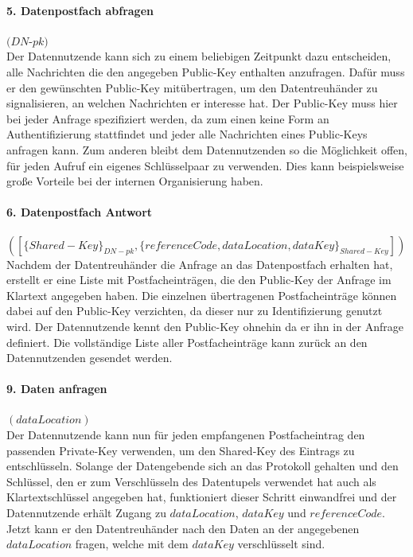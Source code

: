 \documentclass[
	fontsize=12pt,
	headings=small,
	parskip=half,           %
	bibliography=totoc,
	numbers=noenddot,       %
	open=any,               %
]{scrreprt}
\begin{document}
\paragraph{5. Datenpostfach abfragen} $(DN$-$pk)$\\
Der Datennutzende kann sich zu einem beliebigen Zeitpunkt dazu entscheiden, alle Nachrichten die den angegeben Public-Key enthalten anzufragen. Dafür muss er den gewünschten Public-Key mitübertragen, um den Datentreuhänder zu signalisieren, an welchen Nachrichten er interesse hat. Der Public-Key muss hier bei jeder Anfrage spezifiziert werden, da zum einen keine Form an Authentifizierung stattfindet und jeder alle Nachrichten eines Public-Keys anfragen kann. Zum anderen bleibt dem Datennutzenden so die Möglichkeit offen, für jeden Aufruf ein eigenes Schlüsselpaar zu verwenden. Dies kann beispielsweise große Vorteile bei der internen Organisierung haben.

\paragraph{6. Datenpostfach Antwort} $([\{Shared-Key\}_{DN-pk}, \{referenceCode, dataLocation, dataKey\}_{Shared-Key}])$\\
Nachdem der Datentreuhänder die Anfrage an das Datenpostfach erhalten hat, erstellt er eine Liste mit Postfacheinträgen, die den Public-Key der Anfrage im Klartext angegeben haben. Die einzelnen übertragenen Postfacheinträge können dabei auf den Public-Key verzichten, da dieser nur zu Identifizierung genutzt wird. Der Datennutzende kennt den Public-Key ohnehin da er ihn in der Anfrage definiert. Die vollständige Liste aller Postfacheinträge kann zurück an den Datennutzenden gesendet werden.

\paragraph{9. Daten anfragen} $(dataLocation)$\\
Der Datennutzende kann nun für jeden empfangenen Postfacheintrag den passenden Private-Key verwenden, um den Shared-Key des Eintrags zu entschlüsseln. Solange der Datengebende sich an das Protokoll gehalten und den Schlüssel, den er zum Verschlüsseln des Datentupels verwendet hat auch als Klartextschlüssel angegeben hat, funktioniert dieser Schritt einwandfrei und der Datennutzende erhält Zugang zu $dataLocation$, $dataKey$ und $referenceCode$. Jetzt kann er den Datentreuhänder nach den Daten an der angegebenen $dataLocation$ fragen, welche mit dem $dataKey$ verschlüsselt sind.
\end{document}
